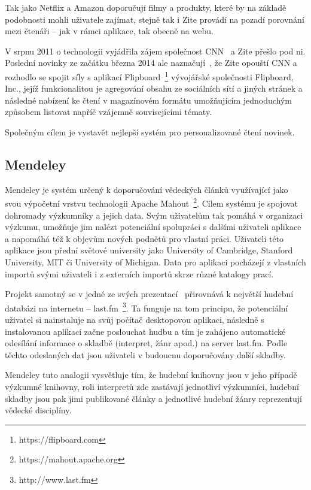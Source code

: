 \documentclass[thesis=M,czech]{FITthesis}[2014/05/07]
\begin{document}
Tak jako Netflix a Amazon doporučují filmy a produkty, které by na základě podobnosti mohli uživatele zajímat, stejně tak i Zite provádí na pozadí porovnání mezi čtenáři – jak v rámci aplikace, tak obecně na webu.

V srpnu 2011 o technologii vyjádřila zájem společnost CNN~\cite{zitecnn} a Zite přešlo pod ni. Poslední novinky ze začátku března 2014 ale naznačují~\cite{ziteflip}, že Zite opouští CNN a rozhodlo se spojit síly s aplikací Flipboard~\footnote{https://flipboard.com} vývojářské společnosti Flipboard, Inc., jejíž funkcionalitou je agregování obsahu ze sociálních sítí a jiných stránek a následné nabízení ke čtení v magazínovém formátu umožňujícím jednoduchým způsobem listovat napříč vzájemně souvisejícími tématy.

Společným cílem je vystavět nejlepší systém pro personalizované čtení novinek. 

\subsection{Mendeley}	

Mendeley je systém určený k doporučování vědeckých článků využívající jako svou výpočetní vrstvu technologii Apache Mahout~\footnote{https://mahout.apache.org}. Cílem systému je spojovat dohromady výzkumníky a jejich data. Svým uživatelům tak pomáhá v organizaci výzkumu, umožňuje jim nalézt potenciální spolupráci s dalšími uživateli aplikace a napomáhá též k objevům nových podnětů pro vlastní práci. Uživateli této aplikace jsou přední světové university jako University of Cambridge, Stanford University, MIT či University of Michigan. Data pro aplikaci pocházejí z vlastních importů svými uživateli i z externích importů skrze různé katalogy prací. 

Projekt samotný se v jedné ze svých prezentací~\cite{mendeleylastfm} přirovnává k největší hudební databázi na internetu – last.fm~\footnote{http://www.last.fm}. Ta funguje na tom principu, že potenciální uživatel si nainstaluje na svůj počítač desktopovou aplikaci, následně s instalovanou aplikací začne poslouchat hudbu a tím je zahájeno automatické odesílání informace o skladbě (interpret, žánr apod.) na server last.fm. Podle těchto odeslaných dat jsou uživateli v budoucnu doporučovány další skladby. 

Mendeley tuto analogii vysvětluje tím, že hudební knihovny jsou v jeho případě výzkumné knihovny, roli interpretů zde zastávají jednotliví výzkumníci, hudební skladby jsou pak jimi publikované články a jednotlivé hudební žánry reprezentují vědecké disciplíny.  
\end{document}

